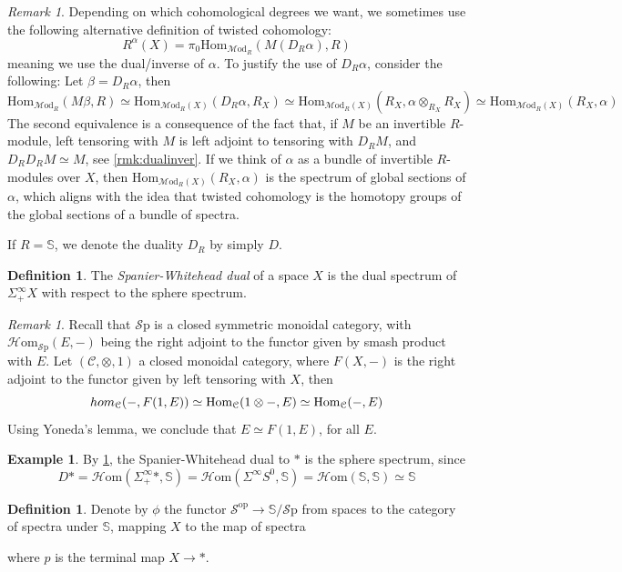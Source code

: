 \documentclass[a4paper]{book}
\newcommand{\lC}{\mathcal{C}}
\newcommand{\lH}{\mathcal{H}}
\newcommand{\lM}{\mathcal{M}}
\newcommand{\lS}{\mathcal{S}}
\newcommand{\bS}{\mathbb{S}}
\newcommand{\op}{\mathrm{op}}
\newcommand{\Sp}{\lS\mathrm{p}} %
\newcommand{\Hom}{\lH\mathrm{om}} %
\renewcommand{\hom}{\mathrm{Hom}} %
\newcommand{\Mod}{\lM\mathrm{od}} %
\theoremstyle{definition}
\newtheorem{definition}[equation]{Definition}
\newtheorem{example}[equation]{Example}
\theoremstyle{remark}
\newtheorem{remark}[equation]{Remark}
\numberwithin{equation}{section}
\begin{document}
\begin{remark} Depending on which cohomological degrees we want, we sometimes use the following alternative definition of	twisted cohomology:
	\[ R^{\alpha}(X) =\pi_0\hom_{\Mod_R}(M(D_R\alpha), R) \]
 meaning we use the dual/inverse of $\alpha$. To justify the use of $D_R\alpha$, consider the following: Let $\beta=D_R\alpha$, then
 \[\hom_{\Mod_R}(M\beta,R)\simeq\hom_{\Mod_{R}(X)}(D_R\alpha,R_X)\simeq\hom_{\Mod_R(X)}(R_X,\alpha\otimes_{R_X}R_X)\simeq\hom_{\Mod_R(X)}(R_X,\alpha)\]The second equivalence is a consequence of the fact that, if $M$ be an invertible $R$-module, left tensoring with $M$ is left adjoint to tensoring with $D_RM$, and $D_RD_RM\simeq M$, see \cref{rmk:dualinver}. If we think of $\alpha$ as a bundle of invertible $R$-modules over $X$, then $\hom_{\Mod_R(X)}(R_X,\alpha)$ is the spectrum of global sections of $\alpha$, which aligns with the idea that {twisted cohomology is the homotopy groups of the global sections of a bundle of spectra}. 
\end{remark}
If $R=\bS$, we denote the duality $D_R$ by simply $D$. 
\begin{definition}
	The \emph{Spanier-Whitehead dual} of a space $X$ is the dual spectrum of $\Sigma^\infty_+X$ with respect to the sphere spectrum.
\end{definition}
\begin{remark}\label{rmk:monunit}
	Recall that $\Sp$ is a closed symmetric monoidal category, with $\Hom_{\Sp}(E,-)$ being the right adjoint to the functor given by smash product with $E$. Let $(\lC,\otimes,1)$ a closed monoidal category, where $F(X,-)$ is the right adjoint to the functor given by left tensoring with $X$, then \[\\hom_\lC(-,F(1,E))\simeq\hom_\lC(1\otimes-,E)\simeq\hom_\lC(-,E)\]Using Yoneda's lemma, we conclude that $E\simeq F(1,E)$, for all $E$. 
\end{remark}
\begin{example}
	By \cref{rmk:monunit}, the Spanier-Whitehead dual to $*$ is the sphere spectrum, since \[D*=\Hom(\Sigma^\infty_+*,\bS)=\Hom(\Sigma^\infty S^0,\bS)=\Hom(\bS,\bS)\simeq\bS\]
\end{example}
\begin{definition}
	Denote by $\phi$ the functor $\lS^{\op}\to\bS/\Sp$ from spaces to the category of spectra under $\bS$, mapping $X$ to the map of spectra \begin{center}
	\end{center}where $p$ is the terminal map $X\to *$.
\end{definition} 
\end{document}
